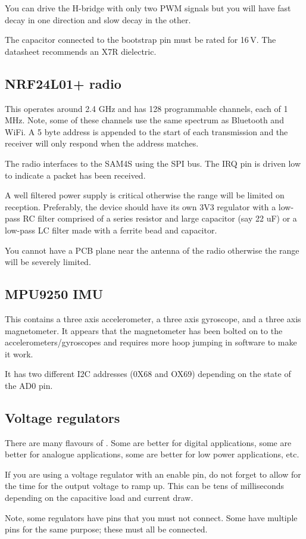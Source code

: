 You can drive the H-bridge with only two PWM signals but you will have
fast decay in one direction and slow decay in the other.

The capacitor connected to the bootstrap pin must be rated for
16\,V. The datasheet recommends an X7R dielectric.



\subsection{NRF24L01+ radio}\label{nrf24l01-radio}

This operates around 2.4 GHz and has 128 programmable channels, each
of 1 MHz.  Note, some of these channels use the same spectrum as
Bluetooth and WiFi.  A 5 byte address is appended to the start of each
transmission and the receiver will only respond when the address
matches.

The radio interfaces to the SAM4S using the SPI bus. The IRQ
pin is driven low to indicate a packet has been received.

A well filtered power supply is critical otherwise the range will be
limited on reception. Preferably, the device should have its own 3V3
regulator with a low-pass RC filter comprised of a series resistor and
large capacitor (say 22 uF) or a low-pass LC filter made with a ferrite
bead and capacitor.

You cannot have a PCB plane near the antenna of the radio otherwise
the range will be severely limited.



\subsection{MPU9250 IMU}\label{mpu9250-imu}

This contains a three axis accelerometer, a three axis gyroscope, and a
three axis magnetometer. It appears that the magnetometer has been
bolted on to the accelerometers/gyroscopes and requires more hoop
jumping in software to make it work.

It has two different I2C addresses (0X68 and OX69) depending on
the state of the AD0 pin.


\subsection{Voltage regulators}\label{voltage-regulators}

There are many flavours of .
Some are better for digital applications, some are better for analogue
applications, some are better for low power applications, etc.

If you are using a voltage regulator with an enable pin, do not forget
to allow for the time for the output voltage to ramp up. This can be
tens of milliseconds depending on the capacitive load and current draw.

Note, some regulators have pins that you must not connect. Some have
multiple pins for the same purpose; these must all be connected.

